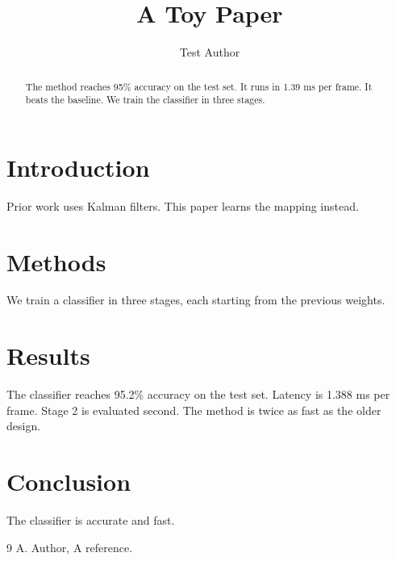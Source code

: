 \documentclass{article}
\begin{document}
\title{A Toy Paper}\author{Test Author}\maketitle
\begin{abstract}
The method reaches 95\% accuracy on the test set. It runs in 1.39 ms per frame.
It beats the baseline. We train the classifier in three stages.
\end{abstract}
\section{Introduction}
Prior work uses Kalman filters. This paper learns the mapping instead.
\section{Methods}
We train a classifier in three stages, each starting from the previous weights.
\section{Results}
The classifier reaches 95.2\% accuracy on the test set. Latency is 1.388 ms per frame.
Stage 2 is evaluated second. The method is twice as fast as the older design.
\section{Conclusion}
The classifier is accurate and fast.
\begin{thebibliography}{9}
 A. Author, A reference.
\end{thebibliography}
\end{document}
